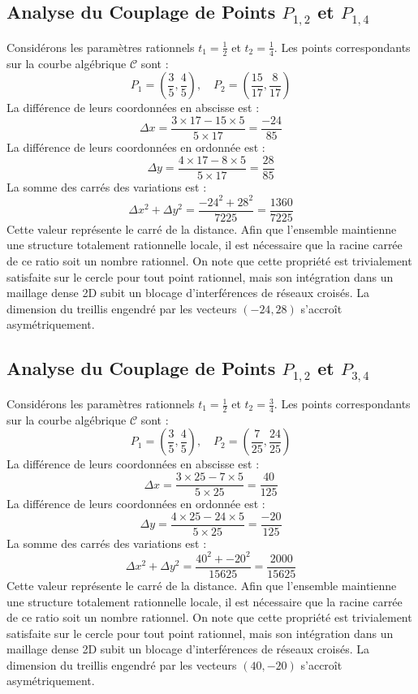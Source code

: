 \documentclass[12pt, a4paper]{article}
\begin{document}
\subsection{Analyse du Couplage de Points $P_{1,2}$ et $P_{1,4}$}
Considérons les paramètres rationnels $t_1 = \frac{1}{2}$ et $t_2 = \frac{1}{4}$.
Les points correspondants sur la courbe algébrique $\mathcal{C}$ sont :
$$ P_1 = \left( \frac{3}{5}, \frac{4}{5} \right), \quad P_2 = \left( \frac{15}{17}, \frac{8}{17} \right) $$
La différence de leurs coordonnées en abscisse est :
$$ \Delta x = \frac{3 \times 17 - 15 \times 5}{5 \times 17} = \frac{-24}{85} $$
La différence de leurs coordonnées en ordonnée est :
$$ \Delta y = \frac{4 \times 17 - 8 \times 5}{5 \times 17} = \frac{28}{85} $$
La somme des carrés des variations est :
$$ \Delta x^2 + \Delta y^2 = \frac{ -24^2 + 28^2 }{ 7225 } = \frac{ 1360 }{ 7225 } $$
Cette valeur représente le carré de la distance. Afin que l'ensemble maintienne une structure totalement rationnelle locale, il est nécessaire que la racine carrée de ce ratio soit un nombre rationnel. On note que cette propriété est trivialement satisfaite sur le cercle pour tout point rationnel, mais son intégration dans un maillage dense 2D subit un blocage d'interférences de réseaux croisés. La dimension du treillis engendré par les vecteurs $( -24, 28 )$ s'accroît asymétriquement.


\subsection{Analyse du Couplage de Points $P_{1,2}$ et $P_{3,4}$}
Considérons les paramètres rationnels $t_1 = \frac{1}{2}$ et $t_2 = \frac{3}{4}$.
Les points correspondants sur la courbe algébrique $\mathcal{C}$ sont :
$$ P_1 = \left( \frac{3}{5}, \frac{4}{5} \right), \quad P_2 = \left( \frac{7}{25}, \frac{24}{25} \right) $$
La différence de leurs coordonnées en abscisse est :
$$ \Delta x = \frac{3 \times 25 - 7 \times 5}{5 \times 25} = \frac{40}{125} $$
La différence de leurs coordonnées en ordonnée est :
$$ \Delta y = \frac{4 \times 25 - 24 \times 5}{5 \times 25} = \frac{-20}{125} $$
La somme des carrés des variations est :
$$ \Delta x^2 + \Delta y^2 = \frac{ 40^2 + -20^2 }{ 15625 } = \frac{ 2000 }{ 15625 } $$
Cette valeur représente le carré de la distance. Afin que l'ensemble maintienne une structure totalement rationnelle locale, il est nécessaire que la racine carrée de ce ratio soit un nombre rationnel. On note que cette propriété est trivialement satisfaite sur le cercle pour tout point rationnel, mais son intégration dans un maillage dense 2D subit un blocage d'interférences de réseaux croisés. La dimension du treillis engendré par les vecteurs $( 40, -20 )$ s'accroît asymétriquement.
\end{document}
